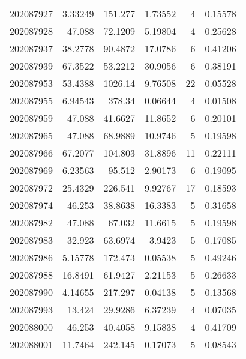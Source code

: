 \begin{tabular}{rrrrrr}
 202087927 &          3.33249 &      151.277  &            1.73552 &           4 & 0.15578 \\
 202087928 &         47.088   &       72.1209 &            5.19804 &           4 & 0.25628 \\
 202087937 &         38.2778  &       90.4872 &           17.0786  &           6 & 0.41206 \\
 202087939 &         67.3522  &       53.2212 &           30.9056  &           6 & 0.38191 \\
 202087953 &         53.4388  &     1026.14   &            9.76508 &          22 & 0.05528 \\
 202087955 &          6.94543 &      378.34   &            0.06644 &           4 & 0.01508 \\
 202087959 &         47.088   &       41.6627 &           11.8652  &           6 & 0.20101 \\
 202087965 &         47.088   &       68.9889 &           10.9746  &           5 & 0.19598 \\
 202087966 &         67.2077  &      104.803  &           31.8896  &          11 & 0.22111 \\
 202087969 &          6.23563 &       95.512  &            2.90173 &           6 & 0.19095 \\
 202087972 &         25.4329  &      226.541  &            9.92767 &          17 & 0.18593 \\
 202087974 &         46.253   &       38.8638 &           16.3383  &           5 & 0.31658 \\
 202087982 &         47.088   &       67.032  &           11.6615  &           5 & 0.19598 \\
 202087983 &         32.923   &       63.6974 &            3.9423  &           5 & 0.17085 \\
 202087986 &          5.15778 &      172.473  &            0.05538 &           5 & 0.49246 \\
 202087988 &         16.8491  &       61.9427 &            2.21153 &           5 & 0.26633 \\
 202087990 &          4.14655 &      217.297  &            0.04138 &           5 & 0.13568 \\
 202087993 &         13.424   &       29.9286 &            6.37239 &           4 & 0.07035 \\
 202088000 &         46.253   &       40.4058 &            9.15838 &           4 & 0.41709 \\
 202088001 &         11.7464  &      242.145  &            0.17073 &           5 & 0.08543 \\

\end{tabular}
